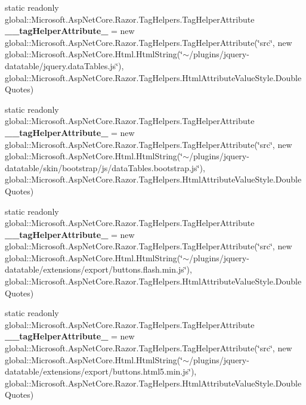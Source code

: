 \begin{DoxyCompactItemize}
\item 
\mbox{\label{class_asp_net_core_1_1_views___items___index_ad2518b6ca333c8697b078234c2a26334}} 
static readonly global\+::\+Microsoft.\+Asp\+Net\+Core.\+Razor.\+Tag\+Helpers.\+Tag\+Helper\+Attribute {\bfseries \+\_\+\+\_\+tag\+Helper\+Attribute\+\_} = new global\+::\+Microsoft.\+Asp\+Net\+Core.\+Razor.\+Tag\+Helpers.\+Tag\+Helper\+Attribute(\char`\"{}src\char`\"{}, new global\+::\+Microsoft.\+Asp\+Net\+Core.\+Html.\+Html\+String(\char`\"{}$\sim$/plugins/jquery-\/datatable/jquery.\+data\+Tables.\+js\char`\"{}), global\+::\+Microsoft.\+Asp\+Net\+Core.\+Razor.\+Tag\+Helpers.\+Html\+Attribute\+Value\+Style.\+Double\+Quotes)
\item 
\mbox{\label{class_asp_net_core_1_1_views___items___index_adaea567d56c21eefac6723054450c2d0}} 
static readonly global\+::\+Microsoft.\+Asp\+Net\+Core.\+Razor.\+Tag\+Helpers.\+Tag\+Helper\+Attribute {\bfseries \+\_\+\+\_\+tag\+Helper\+Attribute\+\_} = new global\+::\+Microsoft.\+Asp\+Net\+Core.\+Razor.\+Tag\+Helpers.\+Tag\+Helper\+Attribute(\char`\"{}src\char`\"{}, new global\+::\+Microsoft.\+Asp\+Net\+Core.\+Html.\+Html\+String(\char`\"{}$\sim$/plugins/jquery-\/datatable/skin/bootstrap/js/data\+Tables.\+bootstrap.\+js\char`\"{}), global\+::\+Microsoft.\+Asp\+Net\+Core.\+Razor.\+Tag\+Helpers.\+Html\+Attribute\+Value\+Style.\+Double\+Quotes)
\item 
\mbox{\label{class_asp_net_core_1_1_views___items___index_a3fa0615e9e7c17a5e59dbe2f5536c658}} 
static readonly global\+::\+Microsoft.\+Asp\+Net\+Core.\+Razor.\+Tag\+Helpers.\+Tag\+Helper\+Attribute {\bfseries \+\_\+\+\_\+tag\+Helper\+Attribute\+\_} = new global\+::\+Microsoft.\+Asp\+Net\+Core.\+Razor.\+Tag\+Helpers.\+Tag\+Helper\+Attribute(\char`\"{}src\char`\"{}, new global\+::\+Microsoft.\+Asp\+Net\+Core.\+Html.\+Html\+String(\char`\"{}$\sim$/plugins/jquery-\/datatable/extensions/export/buttons.\+flash.\+min.\+js\char`\"{}), global\+::\+Microsoft.\+Asp\+Net\+Core.\+Razor.\+Tag\+Helpers.\+Html\+Attribute\+Value\+Style.\+Double\+Quotes)
\item 
\mbox{\label{class_asp_net_core_1_1_views___items___index_aa879ba39171c187335a54352604191f5}} 
static readonly global\+::\+Microsoft.\+Asp\+Net\+Core.\+Razor.\+Tag\+Helpers.\+Tag\+Helper\+Attribute {\bfseries \+\_\+\+\_\+tag\+Helper\+Attribute\+\_} = new global\+::\+Microsoft.\+Asp\+Net\+Core.\+Razor.\+Tag\+Helpers.\+Tag\+Helper\+Attribute(\char`\"{}src\char`\"{}, new global\+::\+Microsoft.\+Asp\+Net\+Core.\+Html.\+Html\+String(\char`\"{}$\sim$/plugins/jquery-\/datatable/extensions/export/buttons.\+html5.\+min.\+js\char`\"{}), global\+::\+Microsoft.\+Asp\+Net\+Core.\+Razor.\+Tag\+Helpers.\+Html\+Attribute\+Value\+Style.\+Double\+Quotes)

\end{DoxyCompactItemize}
